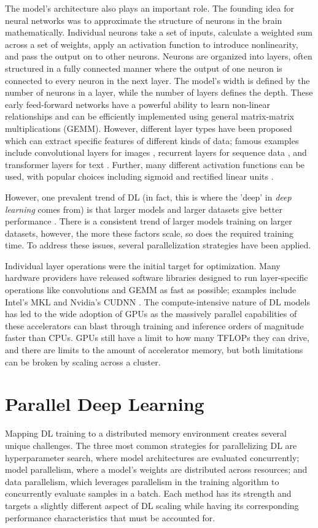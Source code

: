 The model's architecture also plays an important role.
The founding idea for neural networks was to approximate the structure of neurons in the brain mathematically.
Individual neurons take a set of inputs, calculate a weighted sum across a set of weights, apply an activation function to introduce nonlinearity, and pass the output on to other neurons. 
Neurons are organized into layers, often structured in a fully connected manner where the output of one neuron is connected to every neuron in the next layer.
The model's width is defined by the number of neurons in a layer, while the number of layers defines the depth.
These early feed-forward networks have a powerful ability to learn non-linear relationships and can be efficiently implemented using general matrix-matrix multiplications (GEMM).
However, different layer types have been proposed which can extract specific features of different kinds of data; famous examples include convolutional layers for images \cite{Krizhevsky2012AlexNet}, recurrent layers for sequence data \cite{cho2014PhraseRepresentationRNN}, and transformer layers for text \cite{Vaswani2017AttentionTransformer}.
Further, many different activation functions can be used, with popular choices including sigmoid and rectified linear units \cite{Nair2010ReLU}.

However, one prevalent trend of DL (in fact, this is where the 'deep' in \textit{deep learning} comes from) is that larger models and larger datasets give better performance \cite{Kaplan2020ScalingLawsForNLModels, Ben-Nun2019DemystifyDL}.
There is a consistent trend of larger models training on larger datasets, however, the more these factors scale, so does the required training time.
To address these issues, several parallelization strategies have been applied.

Individual layer operations were the initial target for optimization. 
Many hardware providers have released software libraries designed to run layer-specific operations like convolutions and GEMM as fast as possible; examples include Intel's MKL and Nvidia's CUDNN \cite{MKL, cuDNN}. 
The compute-intensive nature of DL models has led to the wide adoption of GPUs as the massively parallel capabilities of these accelerators can blast through training and inference orders of magnitude faster than CPUs.
GPUs still have a limit to how many TFLOPs they can drive, and there are limits to the amount of accelerator memory, but both limitations can be broken by scaling across a cluster.

\section{Parallel Deep Learning}
Mapping DL training to a distributed memory environment creates several unique challenges.
The three most common strategies for parallelizing DL are hyperparameter search, where model architectures are evaluated concurrently; model parallelism, where a model's weights are distributed across resources; and data parallelism, which leverages parallelism in the training algorithm to concurrently evaluate samples in a batch.
Each method has its strength and targets a slightly different aspect of DL scaling while having its corresponding performance characteristics that must be accounted for.

